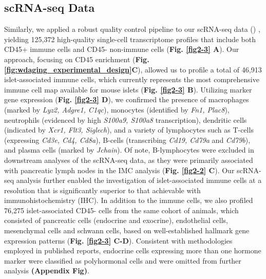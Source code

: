 \subsection{scRNA-seq Data}
Similarly, we applied a robust quality control pipeline to our scRNA-seq data () , yielding 125,372 high-quality single-cell transcriptome profiles that include both CD45+ immune cells and CD45- non-immune cells (\textbf{Fig. \ref{fig2-3} A}). Our approach, focusing on CD45 enrichment (\textbf{Fig. \ref{fig:wdaging_experimental_design}C}), allowed us to profile a total of 46,913 islet-associated immune cells, which currently represents the most comprehensive immune cell map available for mouse islets (\textbf{Fig. \ref{fig2-3} B}). Utilizing marker gene expression (\textbf{Fig. \ref{fig2-3} D}), we confirmed the presence of macrophages (marked by \textit{Lyz2, Adgre1, C1qc}), monocytes (identified by \textit{Fn1, Plac8}), neutrophils (evidenced by high \textit{S100a9, S100a8} transcription), dendritic cells (indicated by \textit{Xcr1, Flt3, Siglech}), and a variety of lymphocytes such as T-cells (expressing \textit{Cd3e, Cd4, Cd8a}), B-cells (transcribing \textit{Cd19, Cd79a} and \textit{Cd79b}), and plasma cells (marked by \textit{Jchain}). Of note, B-lymphocytes were excluded in downstream analyses of the scRNA-seq data, as they were primarily associated with pancreatic lymph nodes in the IMC analysis (\textbf{Fig. \ref{fig2-2} C}). Our scRNA-seq analysis further enabled the investigation of islet-associated immune cells at a resolution that is significantly superior to that achievable with immunohistochemistry (IHC). In addition to the immune cells, we also profiled 76,275 islet-associated CD45- cells from the same cohort of animals, which consisted of pancreatic cells (endocrine and exocrine), endothelial cells, mesenchymal cells and schwann cells, based on well-established hallmark gene expression patterns (\textbf{Fig. \ref{fig2-3} C-D}). Consistent with methodologies employed in published reports, endocrine cells expressing more than one hormone marker were classified as polyhormonal cells and were omitted from further analysis \textbf{(Appendix Fig)}. 

